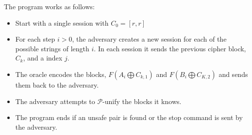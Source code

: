 \documentclass[11pt,twoside,a4paper]{article}
\begin{document}
The program works as follows:
\begin{itemize}
	\item Start with a single session with $C_0 = [r,r]$
	\item For each step $i > 0$, the adversary creates
	a new session for each of the possible strings of length 
	$i$. In each session it sends the previous cipher block, $C_k$, and a index $j$.
	\item The oracle encodes the blocks, $F(A_i \bigoplus C_{k, 1})$ and $F(B_i \bigoplus C_{K, 2})$ and sends them back
	to the adversary.
	\item The adversary attempts to $\mathcal{P}$-unify 
	the blocks it knows. 
	\item The program ends if an unsafe pair is found or 
	the stop command is sent by the adversary.  
\end{itemize}
\end{document}
